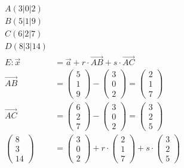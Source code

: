 \documentclass[12pt,a4paper]{report}
\begin{document}
	\begin{align*}
		A(3|0|2) \\
		B(5|1|9) \\
		C(6|2|7) \\
		D(8|3|14) \\
		E: \overrightarrow x &= \overrightarrow a + r \cdot \overrightarrow{AB} + s \cdot \overrightarrow{AC} \\
		\overrightarrow{AB} &= \begin{pmatrix}
			5 \\ 1 \\ 9
		\end{pmatrix} - \begin{pmatrix}
			3 \\ 0 \\ 2
		\end{pmatrix} = \begin{pmatrix}
			2 \\ 1 \\ 7
		\end{pmatrix} \\
		\overrightarrow{AC} &= \begin{pmatrix}
			6 \\ 2 \\ 7
		\end{pmatrix} - \begin{pmatrix}
			3 \\ 0 \\ 2
		\end{pmatrix} = \begin{pmatrix}
			3 \\ 2 \\ 5
		\end{pmatrix} \\
		\begin{pmatrix}
			8 \\ 3 \\ 14
		\end{pmatrix} &= \begin{pmatrix}
			3 \\ 0 \\ 2
		\end{pmatrix} +r\cdot \begin{pmatrix}
			2 \\ 1 \\ 7
		\end{pmatrix} +s \cdot \begin{pmatrix}
			3 \\ 2 \\ 5

\end{pmatrix}
\end{align*}
\end{document}
